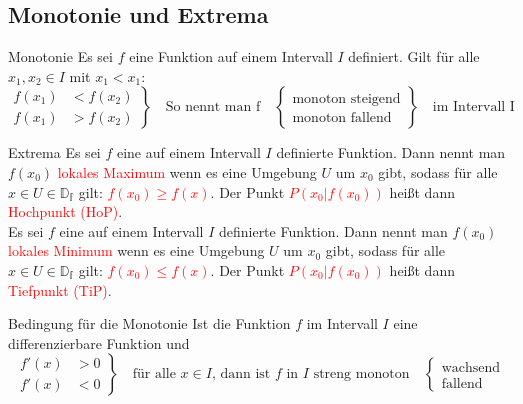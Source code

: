  \subsection{Monotonie und Extrema}   
 \begin{defi}{Monotonie}{}
 Es sei $f$ eine Funktion auf einem Intervall $I$ definiert. Gilt für alle $x_1, x_2 \in I$ mit $x_1<x_1:$
 \begin{equation*}
	\left.\begin{aligned}
	f(x_1) &<  f(x_2)  \\
	f(x_1) &> f(x_2)
	\end{aligned}
	\right\}
\quad \text{So nennt man f}
	\quad\left\{\begin{aligned}
	\text{monoton steigend}  \\
	\text{monoton fallend}
	\end{aligned}
\right\}
\quad
 \text{im Intervall I} 
\end{equation*} 
 \end{defi}
 \begin{defi}{Extrema}{}
   Es sei $f$ eine auf einem Intervall $I$ definierte Funktion. Dann nennt man $f(x_0)$ \textcolor{red}{lokales Maximum} wenn es eine Umgebung $U$ um $x_0$ gibt, sodass für alle  $x \in U \in \mathds{D_f}$ gilt: \textcolor{red}{$f(x_0)\geq f(x)$}. Der Punkt \textcolor{red}{$P(x_0|f(x_0))$} heißt dann \textcolor{red}{Hochpunkt (HoP)}.\\
   Es sei $f$ eine auf einem Intervall $I$ definierte Funktion. Dann nennt man $f(x_0)$ \textcolor{red}{lokales Minimum} wenn es eine Umgebung $U$ um $x_0$ gibt, sodass für alle  $x \in U \in \mathds{D_f}$ gilt: \textcolor{red}{$f(x_0)\leq f(x)$}. Der Punkt \textcolor{red}{$P(x_0|f(x_0))$} heißt dann \textcolor{red}{Tiefpunkt (TiP)}.
 \end{defi}
 \begin{satz}{Bedingung für die Monotonie}{}
 Ist die Funktion $f$ im Intervall $I$ eine differenzierbare Funktion und 
  \begin{equation*}
	\left.\begin{aligned}
	f'(x) &>0  \\
	f'(x) &<0
	\end{aligned}
	\right\}
\quad \text{für alle $x\in I$, dann ist $f$ in $I$ streng monoton}
	\quad\left\{\begin{aligned}
	\text{wachsend}  \\
	\text{fallend}
	\end{aligned}
\right.
\end{equation*} 
 \end{satz}
